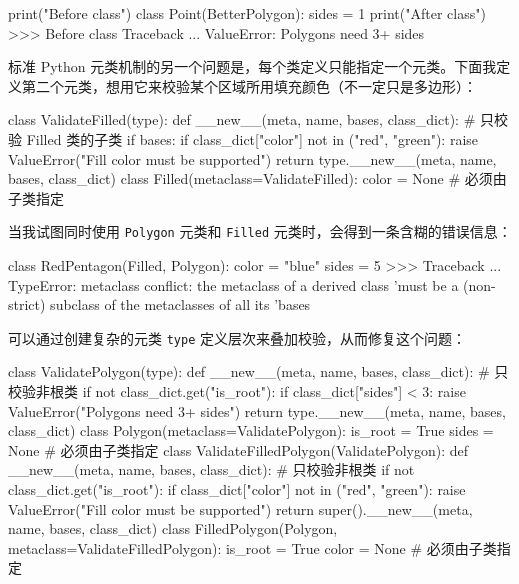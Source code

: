 \begin{codebox}[python]
print("Before class")
class Point(BetterPolygon):
    sides = 1
print("After class")
>>>
Before class
Traceback ...
ValueError: Polygons need 3+ sides
\end{codebox}

标准 Python 元类机制的另一个问题是，每个类定义只能指定一个元类。下面我定义第二个元类，想用它来校验某个区域所用填充颜色（不一定只是多边形）：

\begin{codebox}[python]
class ValidateFilled(type):
    def __new__(meta, name, bases, class_dict):
        # 只校验 Filled 类的子类
        if bases:
            if class_dict["color"] not in ("red", "green"):
                raise ValueError("Fill color must be supported")
        return type.__new__(meta, name, bases, class_dict)
class Filled(metaclass=ValidateFilled):
    color = None  # 必须由子类指定
\end{codebox}

当我试图同时使用 \texttt{Polygon} 元类和 \texttt{Filled} 元类时，会得到一条含糊的错误信息：

\begin{codebox}[python]
class RedPentagon(Filled, Polygon):
    color = "blue"
    sides = 5
>>>
Traceback ...
TypeError: metaclass conflict: the metaclass of a derived class
'must be a (non-strict) subclass of the metaclasses of all its
'bases
\end{codebox}

可以通过创建复杂的元类 \texttt{type} 定义层次来叠加校验，从而修复这个问题：

\begin{codebox}[python]
class ValidatePolygon(type):
    def __new__(meta, name, bases, class_dict):
        # 只校验非根类
        if not class_dict.get("is_root"):
            if class_dict["sides"] < 3:
                raise ValueError("Polygons need 3+ sides")
        return type.__new__(meta, name, bases, class_dict)
class Polygon(metaclass=ValidatePolygon):
    is_root = True
    sides = None  # 必须由子类指定
class ValidateFilledPolygon(ValidatePolygon):
    def __new__(meta, name, bases, class_dict):
        # 只校验非根类
        if not class_dict.get("is_root"):
            if class_dict["color"] not in ("red", "green"):
                raise ValueError("Fill color must be supported")
        return super().__new__(meta, name, bases, class_dict)
class FilledPolygon(Polygon, metaclass=ValidateFilledPolygon):
    is_root = True
    color = None  # 必须由子类指定
\end{codebox}

